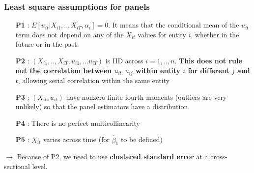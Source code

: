 \documentclass[aspectratio=169]{beamer}
\begin{document}
\begin{frame}
\frametitle{Least square assumptions for panels}

\begin{itemize}
\item  [\textbf{P1}]: $E[u_{it}|X_{i1},..,X_{iT},\alpha_i]=0$. It means that the conditional mean of the $u_{it}$ term does not depend on any of the $X_{it}$ values for entity $i$, whether in the future or in the past. 
\item [\textbf{P2}]: $(X_{i1},..,X_{iT},u_{i1},...u_{iT})$ is IID across $i=1,..,n$. \textbf{This does not rule out the correlation between $u_{it},u_{ij}$ within entity $i$ for different $j$ and $t$}, allowing serial correlation within the same entity
 \item[\textbf{P3}]: $(X_{it},u_{it})$ have nonzero finite fourth moments (outliers are very unlikely) so that the panel estimators have a distribution
\item [\textbf{P4}]: There is no perfect multicollinearity
\item [\textbf{P5}]: $X_{it}$ varies across time (for $\hat{\beta}_1$ to be defined)
\end{itemize}
$\to$ Because of P2, we need to use \textbf{clustered standard error} at a cross-sectional level.
\end{frame}



\end{document}
